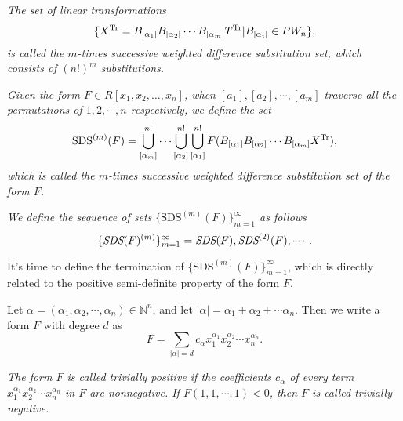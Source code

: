 \documentclass [10pt,a4paper]{article}
\begin{document}
 \begin{definition}\label{zcyydh}
\emph{ The
 set of
linear transformations
\begin{displaymath}
\{X^{\textmd{Tr}}=B_{[\alpha_1]}B_{[\alpha_2]}\cdots
B_{[\alpha_m]}T^{\textmd{Tr}}|B_{[\alpha_i]}\in PW_n\},
\end{displaymath}
is called the $m$-times successive weighted dif\mbox{}ference
substitution set, which consists of $(n!)^m$  substitutions.}
\end{definition}


\begin{definition}\emph{Given the form $F\in R[x_1, x_2, \dots, x_n]$, when $[a_1], [a_2],\cdots,[a_m]$ traverse all the permutations of $1,
2,\cdots,n$ respectively, we def\mbox{}ine the set
\begin{displaymath}
\textrm{SDS}^{(m)}(F)=\bigcup\limits_{[\alpha_m]}^{n!}\cdots
\bigcup\limits_{[\alpha_{2}]}^{n!}\bigcup\limits_{[\alpha_1]}^{n!}F(B_{[\alpha_1]}B_{[\alpha_2]}\cdots
B_{[\alpha_m]}X^{\textmd{Tr}}),
\end{displaymath}
which is called  the $m$-times successive weighted dif\mbox{}ference
substitution set of the form $F$.}
 \end{definition}



\begin{definition}
\emph{  We def\mbox{}ine the sequence of sets
$\{\textrm{SDS}^{(m)}(F)\}_{m=1}^\infty$ as follows}
\begin{displaymath}
\{ \emph{\textrm{SDS}}(F)^{(m)}\}_{m=1}^\infty =
\emph{\textrm{SDS}}(F), \emph{\textrm{SDS}}^{(2)}(F), \cdots .
\end{displaymath}
 \end{definition}

It's time to def\mbox{}ine the termination of
$\{\textrm{SDS}^{(m)}(F)\}_{m=1}^\infty$, which is directly related
to the positive semi-definite property of the form $F$.

Let $\alpha=(\alpha_1,\alpha_2,\cdots,\alpha_n)\in\mathbb{N}^{n}$,
and let $|\alpha|=\alpha_1+\alpha_2+\cdots \alpha_n$. Then we write
a form $F$ with degree $d$ as $$F=\sum\limits_{|\alpha|=d}c_\alpha
x_1^{\alpha_1}x_2^{\alpha_2}\cdots x_n^{\alpha_n}.$$

 \begin{definition}
\emph{ The form $F$ is called trivially positive if the
coef\mbox{}f\mbox{}icients $c_\alpha$ of every term
$x_1^{\alpha_1}x_2^{\alpha_2}\cdots x_n^{\alpha_n}$ in $F$  are
nonnegative.  If $F(1,1,\cdots,1)<0$, then $F$ is called  trivially
negative.}
\end{definition}
\end{document}

